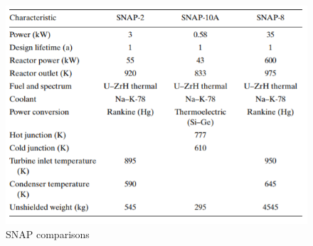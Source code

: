 \documentclass{article}
\begin{document}
\begin{figure}[]
	\centering
	\includegraphics[height=0.35\textheight]{fig/img1}
	\caption[SNAP comparisons]{SNAP comparisons}
	\label{fig1}
\end{figure}
\end{document}

